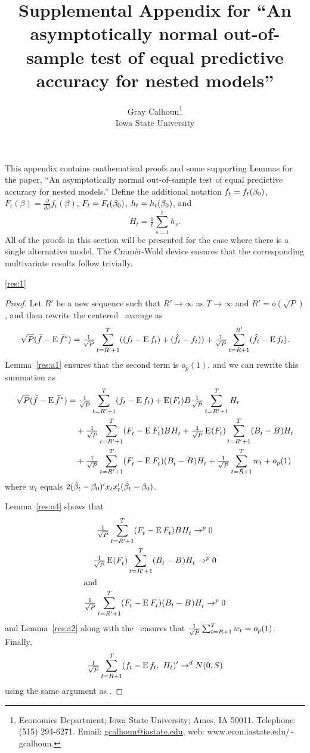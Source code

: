 \documentclass[12pt,fleqn]{article}
\author{Gray Calhoun\thanks{ Economics Department; Iowa State
    University; Ames, IA 50011.  Telephone: (515) 294-6271.  Email:
    \guillemotleft \protect\url{gcalhoun@iastate.edu}\guillemotright,
    web: \guillemotleft www.econ.iastate.edu/\textasciitilde
    gcalhoun\guillemotright.}\\%
  Iowa State University}
\title{Supplemental Appendix for ``An asymptotically normal out-of-sample
  test of equal predictive accuracy for nested models''}
\newcommand{\WesA}[1][]{\ocltb{t}
  (F_t^{#1} - \E^{#1} F_t^{#1}) B^{#1} H_t^{#1}}
\newcommand{\WesB}[1][]{\tfrac{1}{\sqrt{P}} \E^{#1}(F_t^{#1}) \osumb{t} (B_t^{#1} -
  B^{#1}) H_t^{#1}}
\newcommand{\WesC}[1][]{\ocltb{t}
  (F_t^{#1} - \E^{#1} F_t^{#1}) (B_t^{#1} - B^{#1}) H_t^{#1}}
\begin{document}
\maketitle

\noindent%
This appendix contains mathematical proofs and some supporting Lemmas
for the paper, ``An asymptotically normal out-of-sample test of equal
predictive accuracy for nested models.''
Define the additional notation 
$f_t = f_t(\btrue)$,
$F_t(\beta) = \tfrac{\partial}{\partial \beta} f_t(\beta)$,
$F_t = F_t(\btrue)$,
$h_t = h_t(\btrue)$,
and
\begin{equation*}
  H_{t} = \tfrac1t \sum_{s=1}^t h_{s}.
\end{equation*}
All of the proofs in this section will be presented for the case where
there is a single alternative model. The Cram\'er-Wold device ensures
that the corresponding multivariate results follow trivially.

\begin{rthm}{\ref{res:1}}\end{rthm}
\begin{proof}
  Let $R'$ be a new sequence such that $R' \to \infty$ as $T \to \infty$
  and $R' = o(\sqrt{P})$, and then rewrite the centered \oos\ average as
  \begin{equation*}
    \sqrt{P} (\bar{f} - \operatorname{E} \bar{f}^*)
    = \tfrac{1}{\sqrt{P}} \sum_{t=R'+1}^T ((f_t - \operatorname{E} f_t) + (\hat{f}_t - f_t))
      + \tfrac{1}{\sqrt{P}} \sum_{t=R+1}^{R'} (\hat{f}_t - \operatorname{E} f_t).
  \end{equation*}
  Lemma~\ref{res:a1} ensures that the second term is $o_p(1)$, and
  we can rewrite this summation as
  \begin{align*}
    \sqrt{P} (\fb - \E \fb^*)
    &= \ocltb{t} (f_t - \E f_t) + \E(F_t) B \ocltb{t} H_t \\
    & \quad + \WesA + \WesB \\ & \quad + \WesC + \oclt{t} w_t + o_p(1)
  \end{align*}
  where $w_t$ equals $2 (\bh_t - \btrue)' x_t x_t' (\bh_t - \btrue)$.

  Lemma~\ref{res:a4} shows that
  \begin{gather}
    \WesA \to^{p} 0 \label{eq:11} \\
    \WesB \to^{p} 0 \label{eq:12} \\
    \intertext{and}
    \WesC \to^{p} 0 \label{eq:13}
  \end{gather}
  and Lemma~\ref{res:a2} along with the \clt\ ensures that $\tfrac{1}{\sqrt{P}} \sum_{t=R+1}^T
  w_t = o_{p}(1)$. Finally,
  \begin{equation*}
    \tfrac{1}{\sqrt{P}} \sum_{t=R+1}^T (f_t - \operatorname{E} f_t,\ H_t)' \to^d N(0, S)
  \end{equation*}
  using the same argument as \citet{Wes:96}.
\end{proof}
\end{document}
